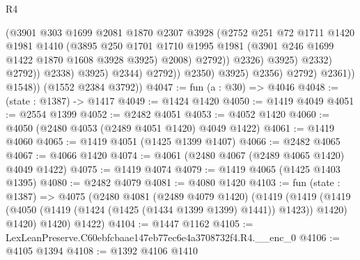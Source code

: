 \begin{lexlean}{R4}
\begin{coremodule}
                                          (@3901
                                            @303
                                            @1699
                                            @2081
                                            @1870
                                            @2307
                                            @3928
                                            (@2752
                                              @251
                                              @72
                                              @1711
                                              @1420
                                              @1981
                                              @1410
                                              (@3895
                                                @250
                                                @1701
                                                @1710
                                                @1995
                                                @1981
                                                (@3901 @246 @1699 @1422 @1870 @1608 @3928 @3925)
                                                @2008)
                                              @2792))
                                          @2326)
                                        @3925)
                                      @2332)
                                    @2792))
                                @2338)
                              @3925)
                            @2344)
                          @2792))
                      @2350)
                    @3925)
                  @2356)
                @2792)
              @2361))
          @1548))
      (@1552 @2384 @3792))
@4047 := fun (a : @30) => @4046
@4048 := (state : @1387) -> @1417
@4049 := @1424 @1420
@4050 := @1419 @4049
@4051 := @2554 @1399
@4052 := @2482 @4051
@4053 := @4052 @1420
@4060 := @4050 (@2480 @4053 (@2489 @4051 @1420) @4049 @1422)
@4061 := @1419 @4060
@4065 := @1419 @4051 (@1425 @1399 @1407)
@4066 := @2482 @4065
@4067 := @4066 @1420
@4074 := @4061 (@2480 @4067 (@2489 @4065 @1420) @4049 @1422)
@4075 := @1419 @4074
@4079 := @1419 @4065 (@1425 @1403 @1395)
@4080 := @2482 @4079
@4081 := @4080 @1420
@4103 := fun (state : @1387) =>
  @4075
    (@2480
      @4081
      (@2489 @4079 @1420)
      (@1419
        (@1419 (@1419 (@4050 (@1419 (@1424 (@1425 (@1434 @1399 @1399) @1441)) @1423)) @1420) @1420)
        @1420)
      @1422)
@4104 := @1447 @1162
@4105 := LexLeanPreserve.C60ebfcbaae147eb77ec6e4a3708732f4.R4.__enc_0
@4106 := @4105 @1394
@4108 := @1392 @4106 @1410

\end{coremodule}
\end{lexlean}
